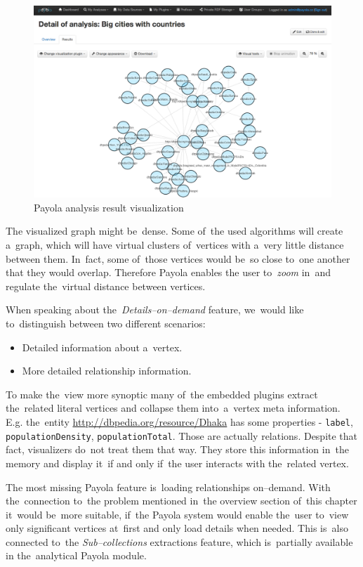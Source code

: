 \begin{figure}
	\centering
	\includegraphics[width=140mm]{img/payola.png}
	\caption{Payola analysis result visualization}
	\label{fig:palyola-vis}
\end{figure}


The visualized graph might be~dense. Some of~the used algorithms will create a~graph, which
will have virtual clusters of~vertices with a~very little distance between them. In~fact, some of~those
vertices would be~so close to~one another that they would overlap. Therefore Payola enables the
user to~\emph{zoom} in~and regulate the~virtual distance between vertices.

When speaking about the~\emph{Details--on--demand} feature, we~would like to~distinguish
between two different
scenarios:

\begin{itemize}
\item Detailed information about a~vertex.
\item More detailed relationship information.
\end{itemize}

To make the~view more synoptic many of~the embedded plugins extract the~related literal
vertices and collapse them into~a~vertex meta information. E.g. the~entity
\url{http://dbpedia.org/resource/Dhaka} has some properties - \texttt{label},
\texttt{populationDensity}, \texttt{populationTotal}.
Those are actually relations. Despite that fact, visualizers do~not treat them
that way. They store this information in~the memory and display it~if and only if~the user
interacts with the~related vertex.

The most missing Payola feature is~loading relationships on--demand. With the~connection to~the
problem
mentioned in~the overview section of~this chapter it~would be~more suitable, if~the Payola system
would enable the~user to~view only significant vertices at~first and only load details when needed.
This is~also connected to~the \emph{Sub--collections} extractions feature, which is~partially available
in the~analytical Payola module.

